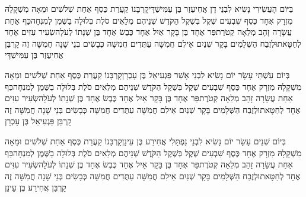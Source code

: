 \documentclass[../main/main.tex]{subfiles}
\begin{document}
\begin{multicols}{\ncols}
בַּיּוֹם הָעֲשִׂירִי נָשִׂיא לִבְנֵי דָן אֲחִיעֶזֶר בֶּן עַמִּישַׁדָּי\PreVerseSpace{}קָרְבָּנוֹ קַעֲרַת כֶּסֶף אַחַת שְׁלֹשִׁים וּמֵאָה מִשְׁקָלָהּ מִזְרָק אֶחָד כֶּסֶף שִׁבְעִים שֶׁקֶל בְּשֶׁקֶל הַקֹּדֶשׁ שְׁנֵיהֶם מְלֵאִים סֹלֶת בְּלוּלָה בַשֶּׁמֶן לְמִנְחָה\PreVerseSpace{}כַּף אַחַת עֲשָׂרָה זָהָב מְלֵאָה קְטֹרֶת\PreVerseSpace{}פַּר אֶחָד בֶּן בָּקָר אַיִל אֶחָד כֶּבֶשׂ אֶחָד בֶּן שְׁנָתוֹ לְעֹלָה\PreVerseSpace{}שְׂעִיר עִזִּים אֶחָד לְחַטָּאת\PreVerseSpace{}וּלְזֶבַח הַשְּׁלָמִים בָּקָר שְׁנַיִם אֵילִם חֲמִשָּׁה עַתֻּדִים חֲמִשָּׁה כְּבָשִׂים בְּנֵי שָׁנָה חֲמִשָּׁה זֶה קָרְבַּן אֲחִיעֶזֶר בֶּן עַמִּישַׁדָּי\OpenSection{}\par
{}בְּיוֹם עַשְׁתֵּי עָשָׂר יוֹם נָשִׂיא לִבְנֵי אָשֵׁר פַּגְעִיאֵל בֶּן עָכְרָן\PreVerseSpace{}קָרְבָּנוֹ קַעֲרַת כֶּסֶף אַחַת שְׁלֹשִׁים וּמֵאָה מִשְׁקָלָהּ מִזְרָק אֶחָד כֶּסֶף שִׁבְעִים שֶׁקֶל בְּשֶׁקֶל הַקֹּדֶשׁ שְׁנֵיהֶם מְלֵאִים סֹלֶת בְּלוּלָה בַשֶּׁמֶן לְמִנְחָה\PreVerseSpace{}כַּף אַחַת עֲשָׂרָה זָהָב מְלֵאָה קְטֹרֶת\PreVerseSpace{}פַּר אֶחָד בֶּן בָּקָר אַיִל אֶחָד כֶּבֶשׂ אֶחָד בֶּן שְׁנָתוֹ לְעֹלָה\PreVerseSpace{}שְׂעִיר עִזִּים אֶחָד לְחַטָּאת\PreVerseSpace{}וּלְזֶבַח הַשְּׁלָמִים בָּקָר שְׁנַיִם אֵילִם חֲמִשָּׁה עַתֻּדִים חֲמִשָּׁה כְּבָשִׂים בְּנֵי שָׁנָה חֲמִשָּׁה זֶה קָרְבַּן פַּגְעִיאֵל בֶּן עָכְרָן\OpenSection{}\par
{}בְּיוֹם שְׁנֵים עָשָׂר יוֹם נָשִׂיא לִבְנֵי נַפְתָּלִי אֲחִירַע בֶּן עֵינָן\PreVerseSpace{}קָרְבָּנוֹ קַעֲרַת כֶּסֶף אַחַת שְׁלֹשִׁים וּמֵאָה מִשְׁקָלָהּ מִזְרָק אֶחָד כֶּסֶף שִׁבְעִים שֶׁקֶל בְּשֶׁקֶל הַקֹּדֶשׁ שְׁנֵיהֶם מְלֵאִים סֹלֶת בְּלוּלָה בַשֶּׁמֶן לְמִנְחָה\PreVerseSpace{}כַּף אַחַת עֲשָׂרָה זָהָב מְלֵאָה קְטֹרֶת\PreVerseSpace{}פַּר אֶחָד בֶּן בָּקָר אַיִל אֶחָד כֶּבֶשׂ אֶחָד בֶּן שְׁנָתוֹ לְעֹלָה\PreVerseSpace{}שְׂעִיר עִזִּים אֶחָד לְחַטָּאת\PreVerseSpace{}וּלְזֶבַח הַשְּׁלָמִים בָּקָר שְׁנַיִם אֵילִם חֲמִשָּׁה עַתֻּדִים חֲמִשָּׁה כְּבָשִׂים בְּנֵי שָׁנָה חֲמִשָּׁה זֶה קָרְבַּן אֲחִירַע בֶּן עֵינָן\OpenSection{}\par

\end{multicols}
\end{document}
